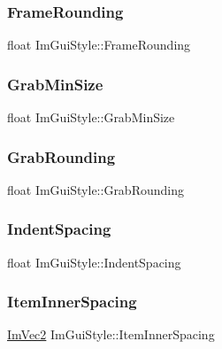 \subsubsection{\texorpdfstring{Frame\+Rounding}{FrameRounding}}
{\footnotesize\ttfamily float Im\+Gui\+Style\+::\+Frame\+Rounding}

\hypertarget{struct_im_gui_style_a04db033d001b343815cdcd2491576ef7}{}\label{struct_im_gui_style_a04db033d001b343815cdcd2491576ef7} 
\subsubsection{\texorpdfstring{Grab\+Min\+Size}{GrabMinSize}}
{\footnotesize\ttfamily float Im\+Gui\+Style\+::\+Grab\+Min\+Size}

\hypertarget{struct_im_gui_style_a42369d83032545066803a7db62936e8f}{}\label{struct_im_gui_style_a42369d83032545066803a7db62936e8f} 
\subsubsection{\texorpdfstring{Grab\+Rounding}{GrabRounding}}
{\footnotesize\ttfamily float Im\+Gui\+Style\+::\+Grab\+Rounding}

\hypertarget{struct_im_gui_style_a32ea292dee2b4e178a227acacd061921}{}\label{struct_im_gui_style_a32ea292dee2b4e178a227acacd061921} 
\subsubsection{\texorpdfstring{Indent\+Spacing}{IndentSpacing}}
{\footnotesize\ttfamily float Im\+Gui\+Style\+::\+Indent\+Spacing}

\hypertarget{struct_im_gui_style_a1a12021be99583fb491cff2df75d1ae1}{}\label{struct_im_gui_style_a1a12021be99583fb491cff2df75d1ae1} 
\subsubsection{\texorpdfstring{Item\+Inner\+Spacing}{ItemInnerSpacing}}
{\footnotesize\ttfamily \hyperlink{struct_im_vec2}{Im\+Vec2} Im\+Gui\+Style\+::\+Item\+Inner\+Spacing}

